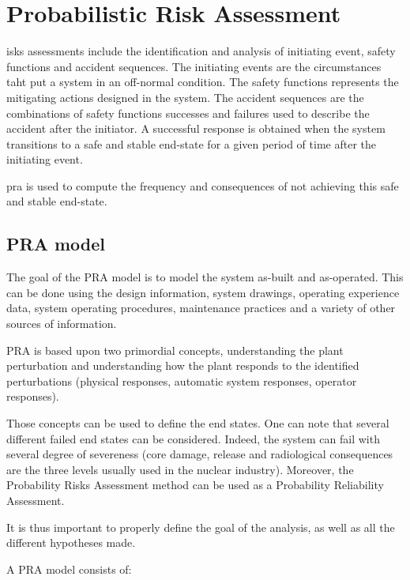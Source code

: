 %
%
\let\textcircled=\pgftextcircled
\chapter{Probabilistic Risk Assessment}
\label{chap:pra}


isks assessments include the identification and analysis of initiating event, safety functions and accident sequences. The initiating events are the circumstances taht put a system in an off-normal condition. The safety functions represents the mitigating actions designed in the system. The accident sequences are the combinations of safety functions successes and failures used to describe the accident after the initiator. A successful response is obtained when the system transitions to a safe and stable end-state for a given period of time after the initiating event.

\gls{pra} is used to compute the frequency and consequences of not achieving this safe and stable end-state.

\section{PRA model}

The goal of the PRA model is to model the system as-built and as-operated. This can be done using the design information, system drawings, operating experience data, system operating procedures, maintenance practices and a variety of other sources of information.

PRA is based upon two primordial concepts, understanding the plant perturbation and understanding how the plant responds to the identified perturbations (physical responses, automatic system responses, operator responses).

Those concepts can be used to define the end states. One can note that several different failed end states can be considered. Indeed, the system can fail with several degree of severeness (core damage, release and radiological consequences are the three levels usually used in the nuclear industry). Moreover, the Probability Risks Assessment method can be used as a Probability Reliability Assessment.

It is thus important to properly define the goal of the analysis, as well as all the different hypotheses made.

A PRA model consists of:

